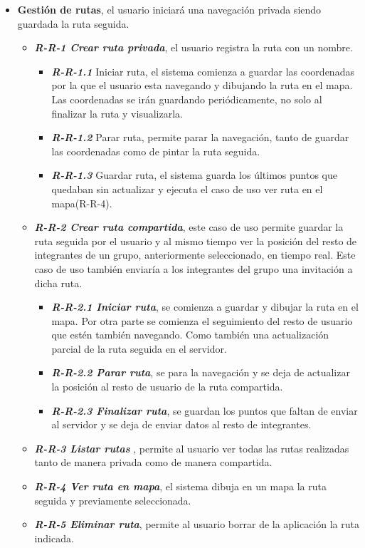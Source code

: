 \begin{itemize}
\item \textbf{Gestión de rutas}, el usuario iniciará una navegación privada siendo guardada la ruta seguida.
\begin{itemize}
\item \textbf{\textit{R-R-1 Crear ruta privada}}, el usuario registra la ruta con un nombre.
\begin{itemize}
\item \textbf{\textit{R-R-1.1}} Iniciar ruta, el sistema comienza a guardar las coordenadas por la que el usuario esta navegando y dibujando la ruta en el mapa. Las coordenadas se irán guardando periódicamente, no solo al finalizar la ruta y visualizarla.
\item\textbf{ \textit{R-R-1.2}} Parar ruta, permite parar la navegación, tanto de guardar las coordenadas como de pintar la ruta seguida.
\item \textbf{\textit{R-R-1.3}} Guardar ruta, el sistema guarda los últimos puntos que quedaban sin actualizar y ejecuta el caso de uso ver ruta en el mapa(R-R-4).
\end{itemize}

\item \textbf{\textit{R-R-2 Crear ruta compartida}}, este caso de uso permite guardar la ruta seguida por el usuario y al mismo tiempo ver la posición del resto de integrantes de un grupo, anteriormente seleccionado, en tiempo real. Este caso de uso también enviaría a los integrantes del grupo una invitación a dicha ruta.
\begin{itemize}
\item \textbf{\textit{R-R-2.1 Iniciar ruta}}, se comienza a guardar y dibujar la ruta en el mapa. Por otra parte se comienza el seguimiento del resto de usuario que estén también navegando. Como también una actualización parcial de la ruta seguida en el servidor.
\item \textbf{\textit{R-R-2.2 Parar ruta}}, se para la navegación y se deja de actualizar la posición al resto de usuario de la ruta compartida.
\item \textbf{\textit{R-R-2.3 Finalizar ruta}}, se guardan los puntos que faltan de enviar al servidor y se deja de enviar datos al resto de integrantes.
\end{itemize}
\item \textbf{\textit{R-R-3 Listar rutas} }, permite al usuario ver todas las rutas realizadas tanto de manera privada como de manera compartida.
\item \textbf{\textit{R-R-4 Ver ruta en mapa}}, el sistema dibuja en un mapa la ruta seguida y previamente seleccionada.
\item \textbf{\textit{R-R-5 Eliminar ruta}}, permite al usuario borrar de la aplicación la ruta indicada.

\end{itemize} 
\end{itemize}
